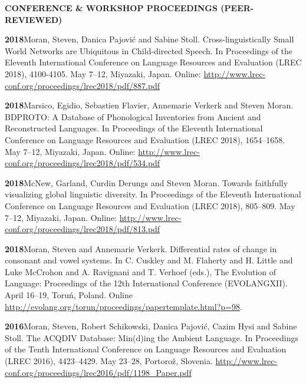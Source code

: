 \documentclass[11pt]{article}
\newcommand{\hangpara}{
 \setlength{\parindent}{0in} %
 \hangindent=0.42in %
}
\begin{document}
\vskip 20pt
\begin{flushleft}
{\bf CONFERENCE \& WORKSHOP PROCEEDINGS (PEER-REVIEWED)}
\end{flushleft}


\hangpara
{\bf 2018}\hspace{1ex}Moran, Steven, Danica Pajovi{\'c} and Sabine Stoll. Cross-linguistically Small World Networks are Ubiquitous in Child-directed Speech. In Proceedings of the Eleventh International Conference on Language Resources and Evaluation (LREC 2018), 4100-4105. May 7--12, Miyazaki, Japan. Online: \url{http://www.lrec-conf.org/proceedings/lrec2018/pdf/887.pdf}

\vskip 6pt
\hangpara
{\bf 2018}\hspace{1ex}Marsico, Egidio, Sebastien Flavier, Annemarie Verkerk and Steven Moran. BDPROTO: A Database of Phonological Inventories from Ancient and Reconstructed Languages. In Proceedings of the Eleventh International Conference on Language Resources and Evaluation (LREC 2018), 1654--1658. May 7--12, Miyazaki, Japan. Online: \url{http://www.lrec-conf.org/proceedings/lrec2018/pdf/534.pdf}

\vskip 6pt
\hangpara
{\bf 2018}\hspace{1ex}McNew, Garland, Curdin Derungs and Steven Moran. Towards faithfully visualizing global linguistic diversity. In Proceedings of the Eleventh International Conference on Language Resources and Evaluation (LREC 2018), 805--809. May 7--12, Miyazaki, Japan. Online: \url{http://www.lrec-conf.org/proceedings/lrec2018/pdf/813.pdf}

\vskip 6pt
\hangpara
{\bf 2018}\hspace{1ex}Moran, Steven and Annemarie Verkerk. Differential rates of change in consonant and vowel systems. In C. Cuskley and M. Flaherty and H. Little and Luke McCrohon and A. Ravignani and T. Verhoef (eds.), The Evolution of Language: Proceedings of the 12th International Conference (EVOLANGXII). April 16--19, Toru{\'n}, Poland. Online \url{http://evolang.org/torun/proceedings/papertemplate.html?p=98}. %

\vskip 6pt
\hangpara
{\bf 2016}\hspace{1ex}Moran, Steven, Robert Schikowski, Danica Pajovi{\'c}, Cazim Hysi and Sabine Stoll. The ACQDIV Database: Min(d)ing the Ambient Language. In Proceedings of the Tenth International Conference on Language Resources and Evaluation (LREC 2016), 4423--4429. May 23--28, Portoro{\v z}, Slovenia. \url{http://www.lrec-conf.org/proceedings/lrec2016/pdf/1198\_Paper.pdf}
\end{document}
